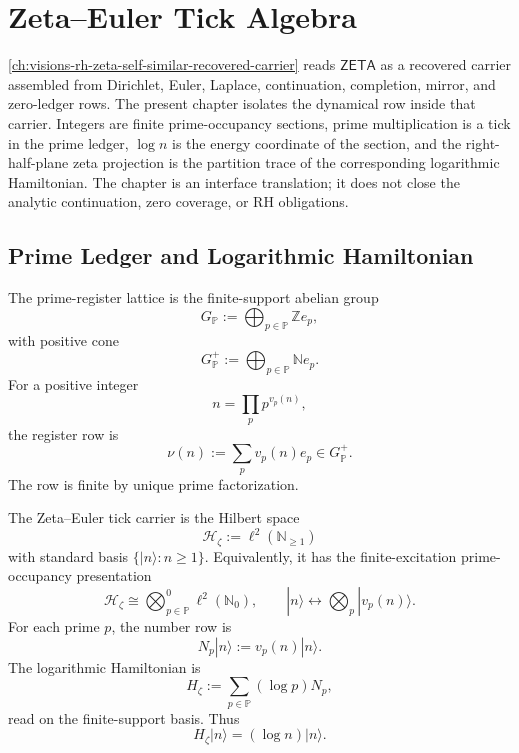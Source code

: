 \chapter{Zeta--Euler Tick Algebra}
\label{ch:visions-rh-zeta-euler-tick-algebra}

\autoref{ch:visions-rh-zeta-self-similar-recovered-carrier} reads
$\mathsf{ZETA}$ as a recovered carrier assembled from Dirichlet, Euler,
Laplace, continuation, completion, mirror, and zero-ledger rows. The
present chapter isolates the dynamical row inside that carrier. Integers
are finite prime-occupancy sections, prime multiplication is a tick in
the prime ledger, $\log n$ is the energy coordinate of the section, and
the right-half-plane zeta projection is the partition trace of the
corresponding logarithmic Hamiltonian. The chapter is an interface
translation; it does not close the analytic continuation, zero coverage,
or RH obligations.

\section{Prime Ledger and Logarithmic Hamiltonian}
\label{sec:rh-zeta-euler-prime-ledger-hamiltonian}

\begin{definition}
\label{def:rh-zeta-euler-prime-register-lattice}
The prime-register lattice is the finite-support abelian group
$$
G_{\mathbb P}:=
\bigoplus_{p\in\mathbb P}\mathbb Z e_p,
$$
with positive cone
$$
G_{\mathbb P}^{+}:=
\bigoplus_{p\in\mathbb P}\mathbb N e_p.
$$
For a positive integer
$$
n=\prod_p p^{v_p(n)},
$$
the register row is
$$
\nu(n):=\sum_p v_p(n)e_p\in G_{\mathbb P}^{+}.
$$
The row is finite by unique prime factorization.
\end{definition}

\begin{definition}
\label{def:rh-zeta-fock-carrier-hamiltonian}
The Zeta--Euler tick carrier is the Hilbert space
$$
\mathcal H_{\zeta}:=\ell^2(\mathbb N_{\ge1})
$$
with standard basis $\{|n\rangle:n\ge1\}$. Equivalently, it has the
finite-excitation prime-occupancy presentation
$$
\mathcal H_{\zeta}
\cong
\bigotimes_{p\in\mathbb P}^{0}\ell^2(\mathbb N_0),
\qquad
|n\rangle
\longleftrightarrow
\bigotimes_p |v_p(n)\rangle.
$$
For each prime $p$, the number row is
$$
N_p|n\rangle:=v_p(n)|n\rangle.
$$
The logarithmic Hamiltonian is
$$
H_{\zeta}:=
\sum_{p\in\mathbb P}(\log p)N_p,
$$
read on the finite-support basis. Thus
$$
H_{\zeta}|n\rangle=(\log n)|n\rangle.
$$
\end{definition}

